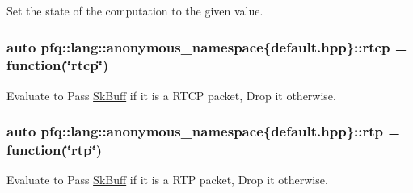 Set the state of the computation to the given value. 

\subsubsection[{\texorpdfstring{rtcp}{rtcp}}]{\setlength{\rightskip}{0pt plus 5cm}auto pfq\+::lang\+::anonymous\+\_\+namespace\{default.\+hpp\}\+::rtcp = {\bf function}(\char`\"{}rtcp\char`\"{})}\hypertarget{namespacepfq_1_1lang_1_1anonymous__namespace_02default_8hpp_03_ad16ac0dfb9ae7abc1db76ab8041bada3}{}\label{namespacepfq_1_1lang_1_1anonymous__namespace_02default_8hpp_03_ad16ac0dfb9ae7abc1db76ab8041bada3}


Evaluate to {\ttfamily Pass} \hyperlink{structpfq_1_1lang_1_1SkBuff}{Sk\+Buff} if it is a R\+T\+CP packet, {\ttfamily Drop} it otherwise. 

\subsubsection[{\texorpdfstring{rtp}{rtp}}]{\setlength{\rightskip}{0pt plus 5cm}auto pfq\+::lang\+::anonymous\+\_\+namespace\{default.\+hpp\}\+::rtp = {\bf function}(\char`\"{}rtp\char`\"{})}\hypertarget{namespacepfq_1_1lang_1_1anonymous__namespace_02default_8hpp_03_aa8ac230fe8eeb0bccee8e31ba032cb8e}{}\label{namespacepfq_1_1lang_1_1anonymous__namespace_02default_8hpp_03_aa8ac230fe8eeb0bccee8e31ba032cb8e}


Evaluate to {\ttfamily Pass} \hyperlink{structpfq_1_1lang_1_1SkBuff}{Sk\+Buff} if it is a R\+TP packet, {\ttfamily Drop} it otherwise. 

